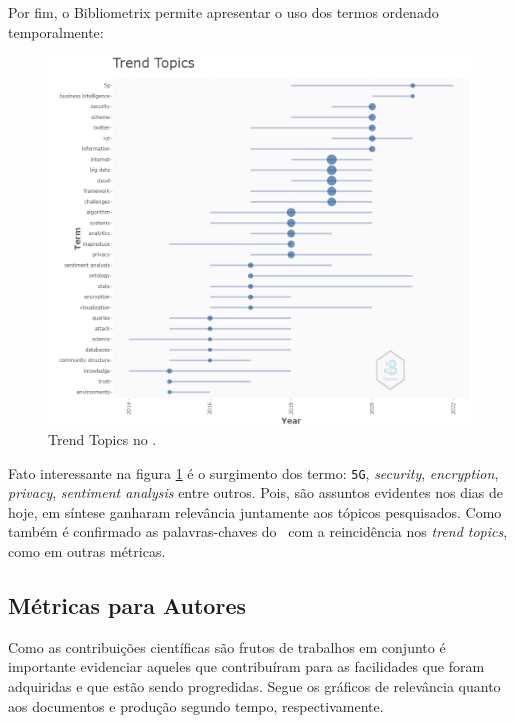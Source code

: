 Por fim, o Bibliometrix permite apresentar o uso dos termos ordenado temporalmente:
\begin{figure}
    \centering
    \includegraphics[width=1\textwidth]{experiments/guioliunb/AnaliseBibliometrica/SocialBigDataAnalysis/TREND TOPICS.png}
    \caption{Trend Topics no \dataset\SBDAA@guioliunb.}
    \label{fig:trend:topics}
\end{figure}

Fato interessante na figura \ref{fig:trend:topics} é o surgimento dos termo: \texttt{5G}, \textit{security}, \textit{encryption}, \textit{privacy}, \textit{sentiment analysis} entre outros. Pois, são assuntos evidentes nos dias de hoje, em síntese ganharam relevância juntamente aos tópicos pesquisados.
Como também é confirmado as palavras-chaves do \dataset\ com a reincidência nos \textit{trend topics}, como em outras métricas.


\subsection{Métricas para Autores}

Como as contribuições científicas são frutos de trabalhos em conjunto é importante evidenciar aqueles que contribuíram para as facilidades que foram adquiridas e que estão sendo progredidas. Segue os gráficos de relevância quanto aos documentos e produção segundo tempo, respectivamente.

